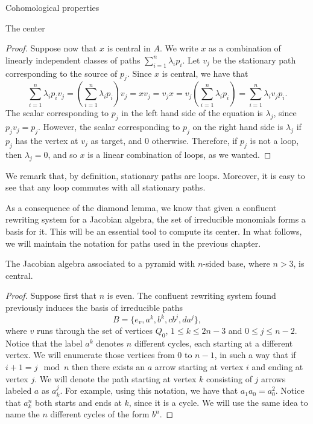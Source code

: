 \begin{chapter}{Cohomological properties}
\begin{section}{The center}
\begin{proof}
Suppose now that $x$ is central in $A$. We write $x$ as a combination of linearly independent classes of paths $\sum_{i=1}^n \lambda_i p_i$. Let $v_j$ be the stationary path corresponding to the source of $p_j$. Since $x$ is central, we have that
\[\sum_{i=1}^n \lambda_i p_iv_j=(\sum_{i=1}^n \lambda_i p_i)v_j = xv_j=v_jx = v_j(\sum_{i=1}^n \lambda_i p_i)=\sum_{i=1}^n \lambda_i v_jp_i.\]
The scalar corresponding to $p_j$ in the left hand side of the equation is $\lambda_j$, since $p_jv_j=p_j$. However, the scalar corresponding to $p_j$ on the right hand side is $\lambda_j$ if $p_j$ has the vertex at $v_j$ as target, and 0 otherwise. Therefore, if $p_j$ is not a loop, then $\lambda_j=0$, and so $x$ is a linear combination of loops, as we wanted.
\end{proof}

We remark that, by definition, stationary paths are loops. Moreover, it is easy to see that any loop commutes with all stationary paths.

As a consequence of the diamond lemma, we know that given a confluent rewriting system for a Jacobian algebra, the set of irreducible monomials forms a basis for it. This will be an essential tool to compute its center. In what follows, we will maintain the notation for paths used in the previous chapter.

\begin{prop} The Jacobian algebra associated to a pyramid with $n$-sided base, where $n>3$, is central.
\end{prop}
\begin{proof} Suppose first that $n$ is even. The confluent rewriting system found previously induces the basis of irreducible paths 
\[B=\{e_v,a^k,b^k,cb^j, da^j\},\] 
where $v$ runs through the set of vertices $Q_0$, $1\leq k\leq 2n-3$ and $0\leq j\leq n-2$. Notice that the label $a^k$ denotes $n$ different cycles, each starting at a different vertex. We will enumerate those vertices from $0$ to $n-1$, in such a way that if $i+1=j \mod n$ then there exists an $a$ arrow starting at vertex $i$ and ending at vertex $j$. We will denote the path starting at vertex $k$ consisting of $j$ arrows labeled $a$ as $a_k^j$. For example, using this notation, we have that $a_1a_0=a_0^2$. Notice that $a_k^n$ both starts and ends at $k$, since it is a cycle. We will use the same idea to name the $n$ different cycles of the form $b^n$.


\end{proof}
\end{section}
\end{chapter}
